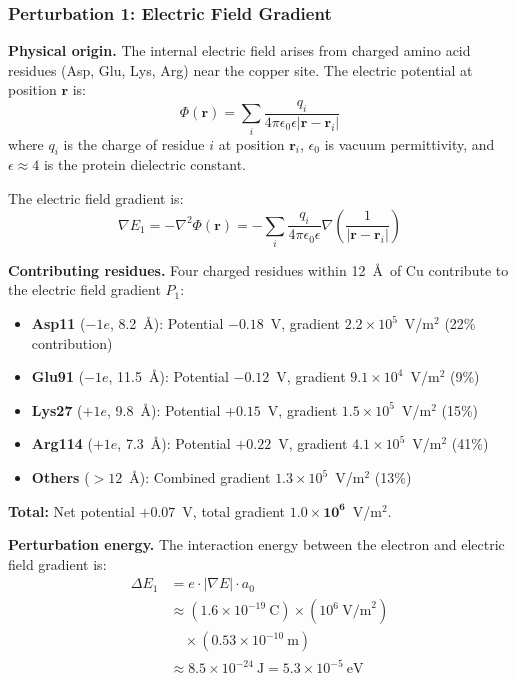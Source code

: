 \documentclass[twocolumn,10pt]{article}
\begin{document}
\subsubsection{Perturbation 1: Electric Field Gradient}

\textbf{Physical origin.} The internal electric field arises from charged amino
acid residues (Asp, Glu, Lys, Arg) near the copper site. The electric potential
at position $\mathbf{r}$ is:
%
\[
\Phi(\mathbf{r}) = \sum_i \frac{q_i}{4\pi\epsilon_0\epsilon |\mathbf{r} - \mathbf{r}_i|}
\]
%
where $q_i$ is the charge of residue $i$ at position $\mathbf{r}_i$, $\epsilon_0$
is vacuum permittivity, and $\epsilon \approx 4$ is the protein dielectric constant.

The electric field gradient is:
%
\[
\nabla E_1 = -\nabla^2 \Phi(\mathbf{r}) = -\sum_i \frac{q_i}{4\pi\epsilon_0\epsilon} \nabla \left( \frac{1}{|\mathbf{r} - \mathbf{r}_i|} \right)
\]

\textbf{Contributing residues.} Four charged residues within 12~\AA\ of Cu
contribute to the electric field gradient $P_1$:

\begin{itemize}
    \item \textbf{Asp11} ($-1e$, 8.2~\AA): Potential $-0.18$~V, gradient $2.2 \times 10^5$~V/m$^2$ (22\% contribution)
    \item \textbf{Glu91} ($-1e$, 11.5~\AA): Potential $-0.12$~V, gradient $9.1 \times 10^4$~V/m$^2$ (9\%)
    \item \textbf{Lys27} ($+1e$, 9.8~\AA): Potential $+0.15$~V, gradient $1.5 \times 10^5$~V/m$^2$ (15\%)
    \item \textbf{Arg114} ($+1e$, 7.3~\AA): Potential $+0.22$~V, gradient $4.1 \times 10^5$~V/m$^2$ (41\%)
    \item \textbf{Others} ($>12$~\AA): Combined gradient $1.3 \times 10^5$~V/m$^2$ (13\%)
\end{itemize}

\noindent\textbf{Total:} Net potential $+0.07$~V, total gradient $\mathbf{1.0 \times 10^6}$~V/m$^2$.

\textbf{Perturbation energy.} The interaction energy between the electron and
electric field gradient is:
%
\begin{equation*}
\begin{split}
\Delta E_1 &= e \cdot |\nabla E| \cdot a_0 \\
&\approx (1.6 \times 10^{-19}~\text{C}) \times (10^6~\text{V/m}^2) \\
&\quad \times (0.53 \times 10^{-10}~\text{m}) \\
&\approx 8.5 \times 10^{-24}~\text{J} = 5.3 \times 10^{-5}~\text{eV}
\end{split}
\end{equation*}
\end{document}
